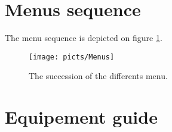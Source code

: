 \documentclass[a4paper,twoside,12pt,dvips]{article}
\begin{document}
\section{Menus sequence}
\label{sec:menusequence}

The menu sequence is depicted on figure \ref{fig:menusequence}.
\begin{figure}[htbp]
  \texttt{[image: picts/Menus]}\centering 
  \caption{The succession of the differents menu.}
  \label{fig:menusequence}
\end{figure}

\section{Equipement guide}
\label{sec:equipementguide}
\end{document}
